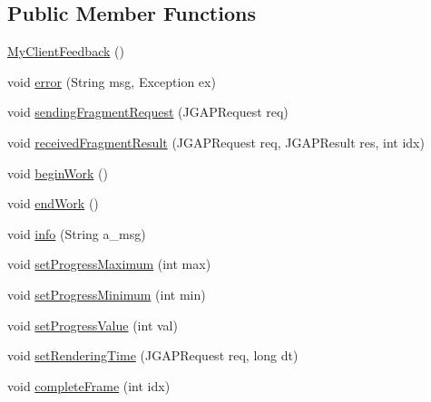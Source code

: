 \subsection*{Public Member Functions}
\begin{DoxyCompactItemize}
\item 
\hyperlink{classexamples_1_1grid_1_1evolution_distributed_1_1_my_client_feedback_afd387eeb61811589556caeca7e755325}{My\-Client\-Feedback} ()
\item 
void \hyperlink{classexamples_1_1grid_1_1evolution_distributed_1_1_my_client_feedback_ab23c973c1f70acafbd78365856e53323}{error} (String msg, Exception ex)
\item 
void \hyperlink{classexamples_1_1grid_1_1evolution_distributed_1_1_my_client_feedback_af63d3679b8eade1870b00df30c162c84}{sending\-Fragment\-Request} (J\-G\-A\-P\-Request req)
\item 
void \hyperlink{classexamples_1_1grid_1_1evolution_distributed_1_1_my_client_feedback_ade521fb5ed84743b5db61b3d7cefc1c5}{received\-Fragment\-Result} (J\-G\-A\-P\-Request req, J\-G\-A\-P\-Result res, int idx)
\item 
void \hyperlink{classexamples_1_1grid_1_1evolution_distributed_1_1_my_client_feedback_aae973dd471a1cac45c8a5f992383b903}{begin\-Work} ()
\item 
void \hyperlink{classexamples_1_1grid_1_1evolution_distributed_1_1_my_client_feedback_a0c9a7d3392732667f66a071bf513673c}{end\-Work} ()
\item 
void \hyperlink{classexamples_1_1grid_1_1evolution_distributed_1_1_my_client_feedback_a7d824125c356e255bd3afce1eab36513}{info} (String a\-\_\-msg)
\item 
void \hyperlink{classexamples_1_1grid_1_1evolution_distributed_1_1_my_client_feedback_a58dedd99308db4d6e5dc03345e388e3d}{set\-Progress\-Maximum} (int max)
\item 
void \hyperlink{classexamples_1_1grid_1_1evolution_distributed_1_1_my_client_feedback_a18c70d7dd2a9edac067b7bfbc8f7b4d2}{set\-Progress\-Minimum} (int min)
\item 
void \hyperlink{classexamples_1_1grid_1_1evolution_distributed_1_1_my_client_feedback_a80ebec147c483da008c2b5716752f44b}{set\-Progress\-Value} (int val)
\item 
void \hyperlink{classexamples_1_1grid_1_1evolution_distributed_1_1_my_client_feedback_a5880bdde09326c9077c225df10a6d5c0}{set\-Rendering\-Time} (J\-G\-A\-P\-Request req, long dt)
\item 
void \hyperlink{classexamples_1_1grid_1_1evolution_distributed_1_1_my_client_feedback_a1981a61e1b52e73691f0f56fdd7f5f70}{complete\-Frame} (int idx)
\end{DoxyCompactItemize}
